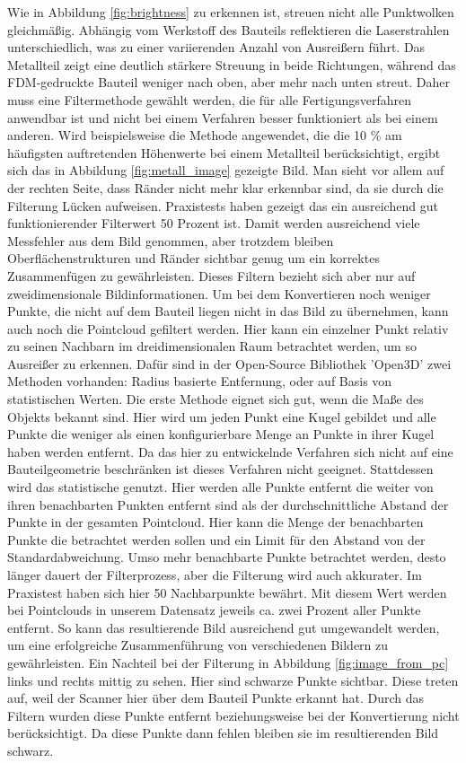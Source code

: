 Wie in Abbildung \ref{fig:brightness} zu erkennen ist, streuen nicht alle Punktwolken
gleichmäßig. Abhängig vom Werkstoff des Bauteils reflektieren die Laserstrahlen 
unterschiedlich, was zu einer variierenden Anzahl von Ausreißern führt. 
Das Metallteil zeigt eine deutlich stärkere Streuung in beide Richtungen, 
während das FDM-gedruckte Bauteil weniger nach oben, 
aber mehr nach unten streut. Daher muss eine Filtermethode gewählt werden, 
die für alle Fertigungsverfahren anwendbar ist und nicht bei einem Verfahren 
besser funktioniert als bei einem anderen. Wird beispielsweise die Methode angewendet, 
die die 10 \% am häufigsten auftretenden Höhenwerte bei einem Metallteil berücksichtigt, 
ergibt sich das in Abbildung \ref{fig:metall_image} gezeigte Bild.
Man sieht vor allem auf der rechten Seite, dass Ränder nicht mehr klar erkennbar sind, 
da sie durch die Filterung Lücken aufweisen. Praxistests haben gezeigt das ein 
ausreichend gut funktionierender Filterwert 50 Prozent ist. Damit werden 
ausreichend viele Messfehler aus dem Bild genommen,
aber trotzdem bleiben Oberflächenstrukturen und Ränder
sichtbar genug um ein korrektes Zusammenfügen zu gewährleisten.
Dieses Filtern bezieht sich aber nur auf zweidimensionale Bildinformationen.
Um bei dem Konvertieren noch weniger Punkte,
die nicht auf dem Bauteil liegen nicht in das Bild zu übernehmen, 
kann auch noch die Pointcloud gefiltert werden.
Hier kann ein einzelner Punkt relativ zu seinen Nachbarn im dreidimensionalen 
Raum betrachtet werden, um so Ausreißer zu erkennen. Dafür sind in der Open-Source
Bibliothek 'Open3D' zwei Methoden vorhanden: Radius basierte Entfernung,
oder auf Basis von statistischen Werten.
Die erste Methode eignet sich gut, wenn die Maße des Objekts bekannt
sind. Hier wird um jeden Punkt eine Kugel gebildet und alle Punkte die weniger als 
einen konfigurierbare Menge an Punkte in ihrer Kugel haben werden entfernt. Da 
das hier zu entwickelnde Verfahren sich nicht auf eine Bauteilgeometrie beschränken
ist dieses Verfahren nicht geeignet. Stattdessen wird das statistische genutzt. 
Hier werden alle Punkte entfernt die weiter von ihren benachbarten Punkten entfernt
sind als der durchschnittliche Abstand der Punkte in der gesamten Pointcloud. 
Hier kann die Menge der benachbarten Punkte die betrachtet werden sollen und
ein Limit für den Abstand von der Standardabweichung. 
Umso mehr benachbarte Punkte betrachtet werden, desto länger dauert der Filterprozess, 
aber die Filterung wird auch akkurater. Im Praxistest haben sich
hier 50 Nachbarpunkte bewährt. Mit diesem Wert werden bei Pointclouds in unserem 
Datensatz jeweils ca. zwei Prozent aller Punkte entfernt. So kann das resultierende
Bild ausreichend gut umgewandelt werden, um eine erfolgreiche Zusammenführung 
von verschiedenen Bildern zu gewährleisten.
Ein Nachteil bei der Filterung in Abbildung \ref{fig:image_from_pc} links und rechts 
mittig zu sehen. Hier sind schwarze Punkte sichtbar. Diese treten auf, weil der Scanner
hier über dem Bauteil Punkte erkannt hat. Durch das Filtern wurden diese Punkte entfernt
beziehungsweise bei der Konvertierung nicht berücksichtigt. Da diese Punkte dann fehlen
bleiben sie im resultierenden Bild schwarz.

